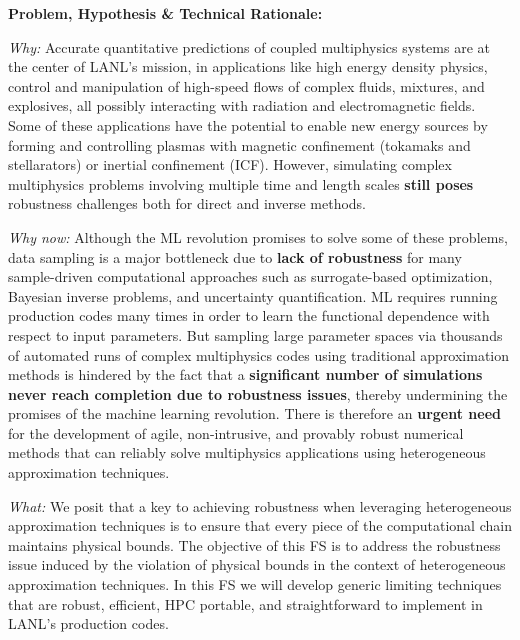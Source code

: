 \documentclass[12pt,twoside]{paper}
\begin{document}
\pagebreak
\textbf{Problem, Hypothesis \& Technical Rationale:}
\vspace*{0.5\baselineskip}

\textit{Why:} Accurate quantitative predictions of coupled multiphysics
systems are at the center of LANL's mission, \eg in applications like high
energy density physics, control and manipulation of high-speed flows of
complex fluids, mixtures, and explosives, all possibly interacting with
radiation and electromagnetic fields. Some of these applications have the
potential to enable new energy sources by forming and controlling plasmas
with magnetic confinement (tokamaks and stellarators) or inertial
confinement (ICF). However, simulating complex multiphysics problems
involving multiple time and length scales \textbf{still poses} robustness
challenges both for direct and inverse methods.

\vspace*{0.5\baselineskip}

\textit{Why now:} Although the ML revolution promises to solve
some of these problems, data sampling is a major bottleneck due to \textbf{lack
of robustness} for many sample-driven computational approaches such as
surrogate-based optimization, Bayesian inverse problems, and uncertainty
quantification. ML requires running production codes many times in
order to learn the functional dependence with respect to input parameters. But
sampling large parameter spaces via thousands of automated runs of complex
multiphysics codes using traditional approximation methods is hindered by the
fact that a \textbf{significant number of simulations never reach completion due to
robustness issues}, thereby undermining the promises of the machine learning
revolution. There is therefore an \textbf{urgent need} for the development of
agile, non-intrusive, and provably robust numerical methods that can reliably
solve multiphysics applications using heterogeneous approximation techniques.

\vspace*{0.5\baselineskip}

\textit{What:} We posit that a key to achieving robustness when leveraging
heterogeneous approximation techniques is to ensure that every piece of the
computational chain maintains physical bounds. The objective of this FS is
to address the robustness issue induced by the violation of physical bounds
in the context of heterogeneous approximation techniques. In this FS we
will develop generic limiting techniques that are robust, efficient, HPC
portable, and straightforward to implement in LANL's production codes.
\end{document}
